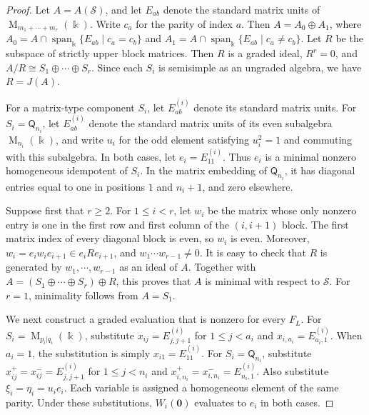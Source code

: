 \documentclass[11pt,reqno]{amsart}
\newcommand{\kk}{\Bbbk}
\newcommand{\Mat}{\operatorname{M}}
\newcommand{\Qtype}{\mathsf Q}
\theoremstyle{definition}
\theoremstyle{remark}
\numberwithin{equation}{section}
\begin{document}
\begin{proof}

Let $A=A(\mathcal S)$, and let $E_{ab}$ denote the standard
matrix units of $\Mat_{m_1+\cdots+m_r}(\kk)$. Write $c_a$ for the
parity of index $a$. Then $A=A_0\oplus A_1$, where
$
A_0=A\cap\operatorname{span}_\kk\{E_{ab}\mid c_a=c_b\}$ and $
A_1=A\cap\operatorname{span}_\kk\{E_{ab}\mid c_a\ne c_b\}$.
Let $R$ be the subspace of strictly upper block matrices.
Then $R$ is a graded ideal, $R^r=0$, and $
A/R\cong S_1\oplus\cdots\oplus S_r$.
Since each $S_i$ is semisimple as an ungraded algebra,
we have $R=J(A)$.

For a matrix-type component $S_i$, let $E_{ab}^{(i)}$
denote its standard matrix units.
For $S_i=\Qtype_{n_i}$, let $E_{ab}^{(i)}$ denote the
standard matrix units of its even subalgebra
$\Mat_{n_i}(\kk)$, and write $u_i$ for the odd element
satisfying $u_i^2=1$ and commuting with this subalgebra.
In both cases, let $e_i=E_{11}^{(i)}$.
Thus $e_i$ is a minimal nonzero homogeneous idempotent
of $S_i$.
In the matrix embedding of $\Qtype_{n_i}$, it has
diagonal entries equal to one in positions $1$ and
$n_i+1$, and zero elsewhere.

Suppose first that $r\geq2$.
For $1\leq i<r$, let $w_i$ be the matrix whose only
nonzero entry is one in the first row and first column
of the $(i,i+1)$ block.
The first matrix index of every diagonal block is even,
so $w_i$ is even.
Moreover, $
w_i=e_iw_ie_{i+1}\in e_iRe_{i+1}$, and $
w_1\cdots w_{r-1}\ne0$.
It is easy to check that $R$ is generated by
$w_1,\cdots,w_{r-1}$ as an ideal of $A$.
Together with $A=(S_1\oplus\cdots\oplus S_r)\oplus R$,
this proves that $A$ is minimal with respect to $\mathcal S$.
For $r=1$, minimality follows from $A=S_1$.

We next construct a graded evaluation that is nonzero
for every $F_L$.
For $S_i=\Mat_{p_i|q_i}(\kk)$, substitute
$x_{ij}=E_{j,j+1}^{(i)}$ for $1\leq j<a_i$
and $x_{i,a_i}=E_{a_i,1}^{(i)}$.
When $a_i=1$, the substitution is simply
$x_{i1}=E_{11}^{(i)}$.
For $S_i=\Qtype_{n_i}$, substitute
$x^+_{ij}=x^-_{ij}=E_{j,j+1}^{(i)}$ for $1\leq j<n_i$
and $x^+_{i,n_i}=x^-_{i,n_i}=E_{n_i,1}^{(i)}$.
Also substitute $\xi_i=\eta_i=u_ie_i$. Each variable is assigned a homogeneous element
of the same parity.
Under these substitutions, $W_i(\mathbf0)$ evaluates
to $e_i$ in both cases.



\end{proof}
\end{document}
